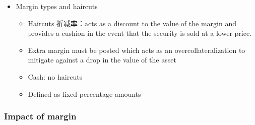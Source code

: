 \begin{itemize}
\item Margin types and haircuts
\begin{itemize}
\item Haircuts 折减率：acts as a discount to the value of the margin and provides a cushion in the event that the security is sold at a lower price.
\item Extra margin must be posted which acts as an overcollateralization to mitigate against a drop in the value of the asset
\item Cash: no haircuts
\item Defined as fixed percentage amounts
\end{itemize}

\end{itemize}







\subsubsection{Impact of margin}

